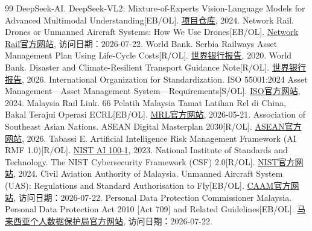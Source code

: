 \documentclass[UTF8,a4paper,zihao=-4]{ctexart}
\begin{document}
\begin{thebibliography}{99}
 DeepSeek-AI. DeepSeek-VL2: Mixture-of-Experts Vision-Language Models for Advanced Multimodal Understanding[EB/OL]. \href{https://github.com/deepseek-ai/DeepSeek-VL2}{项目仓库}, 2024.
 Network Rail. Drones or Unmanned Aircraft Systems: How We Use Drones[EB/OL]. \href{https://www.networkrail.co.uk/our-work/looking-after-the-railway/our-fleet-machines-and-vehicles/air-operations/drones-or-unmanned-aircraft-systems-uas/}{Network Rail官方网站}, 访问日期：2026-07-22.
 World Bank. Serbia Railways Asset Management Plan Using Life-Cycle Costs[R/OL]. \href{https://documents1.worldbank.org/curated/en/726091593064265592/pdf/Serbia-Railways-Asset-Management-Plan-Using-Life-Cycle-Costs.pdf}{世界银行报告}, 2020.
 World Bank. Disaster and Climate-Resilient Transport Guidance Note[R/OL]. \href{https://documents1.worldbank.org/curated/en/099032625173042760/pdf/P180423-670950ea-9b3e-4cb2-a416-bf19ee625e3e.pdf}{世界银行报告}, 2026.
 International Organization for Standardization. ISO 55001:2024 Asset Management---Asset Management System---Requirements[S/OL]. \href{https://www.iso.org/standard/83054.html}{ISO官方网站}, 2024.
 Malaysia Rail Link. 66 Pelatih Malaysia Tamat Latihan Rel di China, Bakal Terajui Operasi ECRL[EB/OL]. \href{https://www.mrl.com.my/my/66-pelatih-malaysia-tamat-latihan-rel-di-china-bakal-terajui-operasi-ecrl/}{MRL官方网站}, 2026-05-21.
 Association of Southeast Asian Nations. ASEAN Digital Masterplan 2030[R/OL]. \href{https://asean.org/wp-content/uploads/2026/01/ASEAN-Digital-Master-Plan-2030-final-2026.pdf}{ASEAN官方网站}, 2026.
 Tabassi E. Artificial Intelligence Risk Management Framework (AI RMF 1.0)[R/OL]. \href{https://doi.org/10.6028/NIST.AI.100-1}{NIST AI 100-1}, 2023.
 National Institute of Standards and Technology. The NIST Cybersecurity Framework (CSF) 2.0[R/OL]. \href{https://www.nist.gov/cyberframework}{NIST官方网站}, 2024.
 Civil Aviation Authority of Malaysia. Unmanned Aircraft System (UAS): Regulations and Standard Authorisation to Fly[EB/OL]. \href{https://www.caam.gov.my/public/unmanned-aircraft-system-uas/}{CAAM官方网站}, 访问日期：2026-07-22.
 Personal Data Protection Commissioner Malaysia. Personal Data Protection Act 2010 [Act 709] and Related Guidelines[EB/OL]. \href{https://www.pdp.gov.my/ppdpv1/en/akta/pdp-act-2010-en/}{马来西亚个人数据保护局官方网站}, 访问日期：2026-07-22.
\end{thebibliography}
\end{document}

